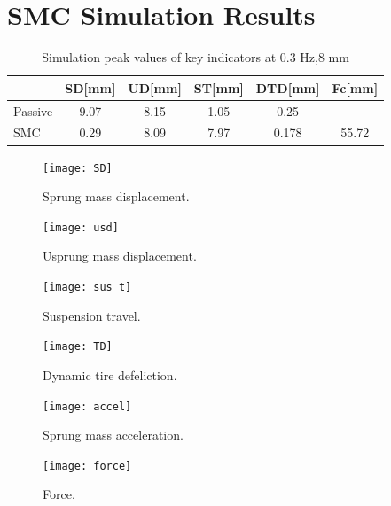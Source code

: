 \section{SMC Simulation Results}
\begin{table}[h]
	\centering
	\caption{Simulation peak values of key indicators at 0.3 Hz,8 mm}
	\begin{tabular}{lccccc}
		
		\hline
		\textbf{} & \textbf{SD[mm]} & \textbf{UD[mm]}  & \textbf{ST[mm]}  & \textbf{DTD[mm]}  & \textbf{Fc[mm]}  \\
		\hline
		
		Passive & 9.07 & 8.15 & 1.05 & 0.25 & - \\
		SMC & 0.29& 8.09 & 7.97 &  0.178 & 55.72 \\
		
		
		\hline
		
	\end{tabular}
\end{table}

\begin{figure}[H]
	\centering
	\texttt{[image: SD]}
	\caption{Sprung mass displacement. }
\end{figure}

\begin{figure}[H]
	\centering
	\texttt{[image: usd]}
	\caption{Usprung mass displacement. }
\end{figure}

\begin{figure}[H]
	\centering
	\texttt{[image: sus t]}
	\caption{Suspension travel. }
\end{figure}

\begin{figure}[H]
	\centering
	\texttt{[image: TD]}
	\caption{Dynamic tire defeliction. }
\end{figure}

\begin{figure}[H]
	\centering
	\texttt{[image: accel]}
	\caption{Sprung mass acceleration. }
\end{figure}

\begin{figure}[H]
	\centering
	\texttt{[image: force]}
	\caption{Force. }
\end{figure}

